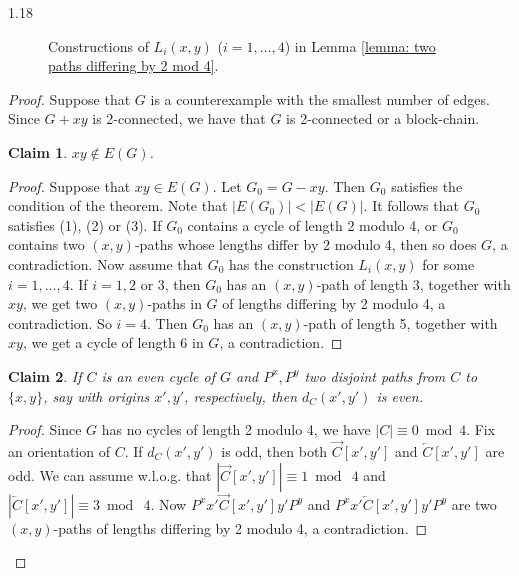 \documentclass[10pt]{article}
\newtheorem{claim}{Claim}
\begin{document}
\begin{spacing}{1.18}
\begin{figure}[ht]
\caption{Constructions of $L_i(x,y)$ ($i=1,\ldots,4$) in Lemma \ref{lemma: two paths differing by 2 mod 4}.}\label{Fig: 4 possibilities of G}
\end{figure}

\begin{proof}
Suppose that $G$ is a counterexample with the smallest number of edges. Since $G+xy$ is 2-connected, we have that $G$ is 2-connected or a block-chain.

\setcounter{claim}{0}
\begin{claim}\label{claim: xynotinE}
    $xy\notin E(G)$.    
\end{claim}

\begin{proof}
    Suppose that $xy\in E(G)$. Let $G_0=G-xy$. Then $G_0$ satisfies the condition of the theorem. Note that $|E(G_0)|<|E(G)|$. It follows that $G_0$ satisfies (1), (2) or (3). If $G_0$ contains a cycle of length 2 modulo 4, or $G_0$ contains two $(x,y)$-paths whose lengths differ by 2 modulo 4, then so does $G$, a contradiction. Now assume that $G_0$ has the construction $L_i(x,y)$ for some $i=1,\ldots,4$. If $i=1, 2$ or 3, then $G_0$ has an $(x,y)$-path of length 3, together with $xy$, we get two $(x,y)$-paths in $G$ of lengths differing by 2 modulo 4, a contradiction. So $i=4$. Then $G_0$ has an $(x,y)$-path of length 5, together with $xy$, we get a cycle of length 6 in $G$, a contradiction.
\end{proof}

\begin{claim}\label{claim: no two odd paths}
    If $C$ is an even cycle of $G$ and $P^x,P^y$ two disjoint paths from $C$ to $\{x,y\}$, say with origins $x',y'$, respectively, then $d_C(x',y')$ is even. 
\end{claim}

\begin{proof}
    Since $G$ has no cycles of length 2 modulo 4, we have $|C|\equiv 0\bmod 4$.
    Fix an orientation of $C$.
    If $d_C(x',y')$ is odd, then both $\overrightarrow{C}[x',y']$ and $\overleftarrow{C}[x',y']$ are odd. We can assume w.l.o.g. that $|\overrightarrow{C}[x',y']|\equiv 1\bmod~4$ and $|\overleftarrow{C}[x',y']|\equiv 3\bmod~4$. Now $P^xx'\overrightarrow{C}[x',y']y'P^y$ and $P^xx'\overleftarrow{C}[x',y']y'P^y$ are two $(x,y)$-paths of lengths differing by 2 modulo 4, a contradiction.
\end{proof}


\end{proof}
\end{spacing}
\end{document}
